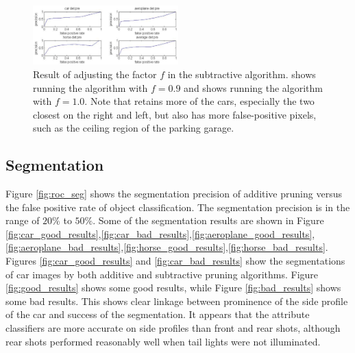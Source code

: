 \documentclass[10pt,twocolumn,letterpaper]{article}
\begin{document}
\begin{figure}
\centering
\includegraphics[width=0.5\textwidth]{figures/add_res/roc_class.png.eps}
\caption{Result of adjusting the factor $f$ in the subtractive
algorithm.  shows running the algorithm with $f=0.9$
and  shows running the algorithm with $f=1.0$.  Note
that  retains more of the cars, especially the two
closest on the right and left, but also has more false-positive
pixels, such as the ceiling region of the parking garage.}
\label{fig:roc_class}
\end{figure}


\subsection{Segmentation}
\label{ssec:segmentation}

Figure \ref{fig:roc_seg} shows the segmentation precision of additive pruning 
versus the false positive rate of object classification. The segmentation precision
is in the range of $20\%$ to $50\%$. Some of the segmentation results are shown in 
Figure \ref{fig:car_good_results},\ref{fig:car_bad_results},\ref{fig:aeroplane_good_results},\ref{fig:aeroplane_bad_results},\ref{fig:horse_good_results},\ref{fig:horse_bad_results}.\\

Figures \ref{fig:car_good_results} and \ref{fig:car_bad_results} show the
segmentations of car images by both additive and subtractive pruning
algorithms. Figure \ref{fig:good_results} shows some good results,
while Figure \ref{fig:bad_results} shows some bad results. This
shows clear linkage between prominence of the side profile of the
car and success of the segmentation. It appears that the attribute
classifiers are more accurate on side profiles than front and rear
shots, although rear shots performed reasonably well when tail
lights were not illuminated.\\
\end{document}
